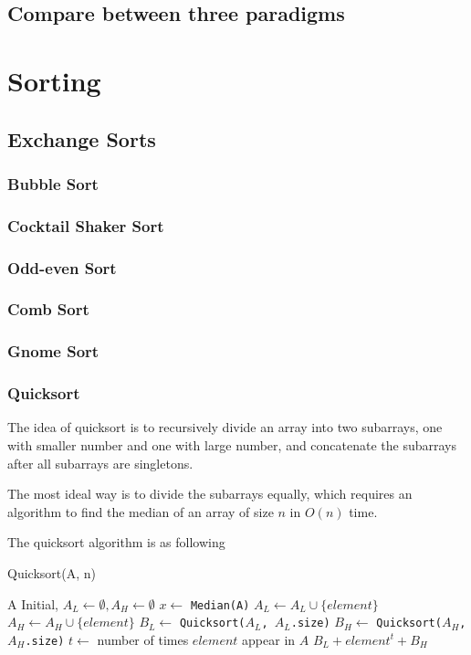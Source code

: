 		\section{Compare between three paradigms}


	\chapter{Sorting}
		\section{Exchange Sorts}
			\subsection{Bubble Sort}

			\subsection{Cocktail Shaker Sort}

			\subsection{Odd-even Sort}

			\subsection{Comb Sort}

			\subsection{Gnome Sort}

			\subsection{Quicksort}
				The idea of quicksort is to recursively divide an array into two subarrays, one with smaller number and one with large number, and concatenate  the subarrays after all subarrays are singletons.

				The most ideal way is to divide the subarrays equally, which requires an algorithm to find the median of an array of size $n$ in $O(n)$ time.

				The quicksort algorithm is as following
				\begin{algorithm}[h]
					\caption{Quicksort(A, n)}
					\begin{algorithmic}[1]
							\Return A
						\EndIf
						\State Initial, $A_L \gets \emptyset, A_H \gets \emptyset$
						\State $x \gets$ \texttt{Median(A)}
								\State $A_L \gets A_L \cup \{element\}$
							\Else
								\State $A_H \gets A_H \cup \{element\}$
							\EndIf
						\EndFor
						\State $B_L \gets$ \texttt{Quicksort($A_L$, $A_L$.size)}
						\State $B_H \gets$ \texttt{Quicksort($A_H$, $A_H$.size)}
						\State $t \gets$ number of times $element$ appear in $A$
						\Return $B_L + element^t + B_H$
					\end{algorithmic}
				\end{algorithm}

